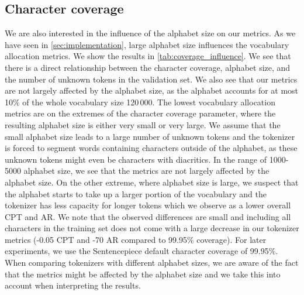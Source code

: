 \subsection{Character coverage}
\label{sec:character_coverage}



We are also interested in the influence of the alphabet size on our metrics. As we have seen in \autoref{sec:implementation}, large alphabet size influences the vocabulary allocation metrics.
We show the results in \autoref{tab:coverage_influence}. 
We see that there is a direct relationship between the character coverage, alphabet size, and the number of unknown tokens in the validation set. We also see that our metrics are not largely affected by the alphabet size, as the alphabet accounts for at most 10\% of the whole vocabulary size 120\,000. The lowest vocabulary allocation metrics are on the extremes of the character coverage parameter, where the resulting alphabet size is either very small or very large. We assume that the small alphabet size leads to a large number of unknown tokens and the tokenizer is forced to segment words containing characters outside of the alphabet, as these unknown tokens might even be characters with diacritics. In the range of 1000-5000 alphabet size, we see that the metrics are not largely affected by the alphabet size. On the other extreme, where alphabet size is large, we suspect that the alphabet starts to take up a larger portion of the vocabulary and the tokenizer has less capacity for longer tokens which we observe as a lower overall CPT and AR. We note that the observed differences are small and including all characters in the training set does not come with a large decrease in our tokenizer metrics (-0.05 CPT and -70 AR compared to 99.95\% coverage). For later experiments, we use the Sentencepiece default character coverage of 99.95\%. When comparing tokenizers with different alphabet sizes, we are aware of the fact that the metrics might be affected by the alphabet size and we take this into account when interpreting the results.

